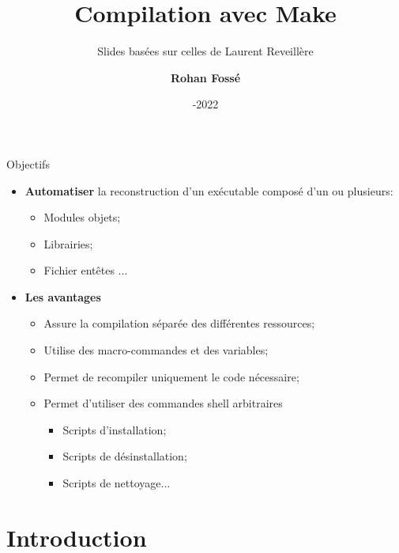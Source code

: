 \documentclass[10pt,xcolor=dvipsnames]{beamer}
\title{
    Compilation avec Make
}
\subtitle{Slides basées sur celles de Laurent Reveillère}
\date{\centering 2021-2022}
\author{\centering \bf Rohan Fossé}
\begin{document}
\maketitle



  \begin{frame}{Objectifs}
      \begin{itemize}
          \item \textbf{Automatiser} la reconstruction d'un exécutable composé d'un ou plusieurs:
          \begin{itemize}
              \item Modules objets;
              \item Librairies;
              \item Fichier entêtes ...
          \end{itemize}
          \item \textbf{Les avantages}
          \begin{itemize}
              \item Assure la compilation séparée des différentes ressources;
              \item Utilise des macro-commandes et des variables;
              \item Permet de recompiler uniquement le code nécessaire;
              \item Permet d'utiliser des commandes shell arbitraires
              \begin{itemize}
                  \item Scripts d'installation;
                  \item Scripts de désinstallation;
                  \item Scripts de nettoyage...
              \end{itemize}
          \end{itemize}
      \end{itemize}
  \end{frame}

\section{Introduction}
\end{document}
